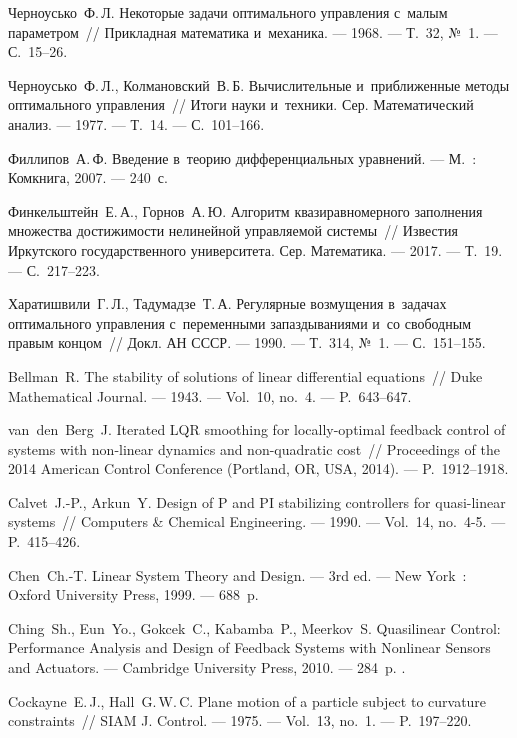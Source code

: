 \documentclass[../main.tex]{subfiles}
\begin{document}
\begin{thebibliography}{99}
Черноусько~Ф.\,Л. Некоторые задачи оптимального управления с~малым параметром~// Прикладная математика и~механика. --- 1968. --- Т.~32, №~1. --- С.~15--26.

Черноусько~Ф.\,Л., Колмановский~В.\,Б. Вычислительные и~приближенные методы оптимального управления~// Итоги науки и~техники. Сер. Математический анализ. --- 1977. --- Т.~14. --- С.~101--166.

Филлипов~А.\,Ф. Введение в~теорию дифференциальных уравнений. --- М.~: Комкнига, 2007. --- 240~с.

Финкельштейн~Е.\,А., Горнов~А.\,Ю. Алгоритм квазиравномерного заполнения множества достижимости нелинейной управляемой системы~// Известия Иркутского государственного университета. Сер. Математика. --- 2017. --- Т.~19. --- С.~217--223.

Харатишвили~Г.\,Л., Тадумадзе~Т.\,А. Регулярные возмущения в~задачах оптимального управления с~переменными запаздываниями и~со свободным правым концом~// Докл. АН СССР. --- 1990. --- Т.~314, №~1. --- С.~151--155.

Bellman~R. The stability of solutions of linear differential equations~// Duke Mathematical Journal. --- 1943. --- Vol.~10, no.~4. --- P.~643--647.

van~den~Berg~J. Iterated LQR smoothing for locally-optimal feedback control of systems with non-linear dynamics and non-quadratic cost~// Proceedings of the 2014 American Control Conference (Portland, OR, USA, 2014). --- P.~1912--1918.

Calvet~J.-P., Arkun~Y. Design of P and PI stabilizing controllers for quasi-linear systems~// Computers \& Chemical Engineering. --- 1990. --- Vol.~14, no.~4-5. --- P.~415--426. 

Chen~Ch.-T. Linear System Theory and Design. --- 3rd ed. --- New York~: Oxford University Press, 1999. --- 688~p.

Ching~Sh., Eun~Yo., Gokcek~C., Kabamba~P., Meerkov~S. Quasilinear Control: Performance Analysis and Design of Feedback Systems with Nonlinear Sensors and Actuators. --- Cambridge University Press, 2010. --- 284~p. . 

Cockayne~E.\,J., Hall~G.\,W.\,C. Plane motion of a particle subject to curvature constraints~// SIAM J. Control. --- 1975. --- Vol.~13, no.~1. --- P.~197--220. 


\end{thebibliography}
\end{document}
